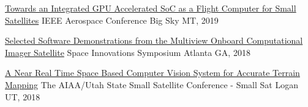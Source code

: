 \documentclass[10pt,a4paper]{article}
\begin{document}
\headedsection
  {{\color{bluegreen} \faStickyNoteO} \href{http://smallsat.uga.edu/images/documents/papers/Adams_GPU_Paper.pdf}{Towards an Integrated GPU Accelerated SoC as a Flight Computer for Small Satellites}}{%
  \headedsubsection
    {IEEE Aerospace Conference}
    {Big Sky MT, 2019}
    {}
}


\headedsection
  {{\color{bluegreen} \faTelevision} \href{http://smallsat.uga.edu/images/documents/presentations/MOCI_Software_Demo2018.pdf}{Selected Software Demonstrations from the Multiview Onboard Computational Imager Satellite}}{%
  \headedsubsection
    {Space Innovations Symposium}
    {Atlanta GA, 2018}
    {}
}



\headedsection
  {{\color{bluegreen} \faStickyNoteO} \href{http://smallsat.uga.edu/images/documents/papers/Adams_32nd_SmallSatConference.pdf}{A Near Real Time Space Based Computer Vision System for Accurate Terrain Mapping}}{%
  \headedsubsection
    {The AIAA/Utah State Small Satellite Conference - Small Sat}
    {Logan UT, 2018}
    {}
}

\end{document}
